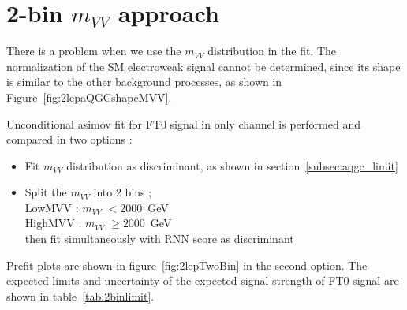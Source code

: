 \section{2-bin $m_{VV}$ approach}
\label{subsec:2binapproach}

There is a problem when we use the $m_{VV}$ distribution in the fit.
The normalization of the SM electroweak signal cannot be determined, since its shape is similar to the other background processes, as shown in Figure~\ref{fig:2lepaQGCshapeMVV}.

Unconditional asimov fit for FT0 signal in only \tlep channel is performed and compared in two options :
\begin{itemize}
  \item Fit $m_{VV}$ distribution as discriminant, as shown in section~\ref{subsec:aqgc_limit}
  \item Split the $m_{VV}$ into 2 bins ;  \\
        LowMVV : $m_{VV}$ $< 2000$~GeV \\
        HighMVV : $m_{VV}$ $\geq 2000$~GeV \\
        then fit simultaneously with RNN score as discriminant
\end{itemize}
Prefit plots are shown in figure~\ref{fig:2lepTwoBin} in the second option.
The expected limits and uncertainty of the expected signal strength of FT0 signal are shown in table~\ref{tab:2binlimit}.


